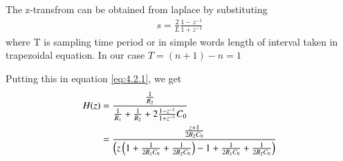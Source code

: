 \documentclass[journal,12pt,twocolumn]{IEEEtran}
\renewcommand\thesection{\arabic{section}}
\begin{document}
\begin{enumerate}[label=\arabic*.,ref=\thesection.\theenumi]
		\solution The z-transfrom can be obtained from laplace by substituting
		\begin{align}
			s=\frac{2}{L}\frac{1-z^{-1}}{1+z^{-1}}
		\end{align}
		where T is sampling time period or in simple words length of interval taken in trapezoidal equation. In our case $T=(n+1)-n=1$

		Putting this in equation \eqref{eq:4.2.1}, we get
		\begin{align}
			H(z)&=\frac{\frac{1}{R_2}}{\frac{1}{R_1}+\frac{1}{R_2}+2\frac{1-z^{-1}}{1+z^{-1}}C_0}\\
			&=\frac{\frac{z+1}{2R_2C_0}}{\left(z\left(1+\frac{1}{2R_1C_0}+\frac{1}{2R_2C_0}\right)-1+\frac{1}{2R_1C_0}+\frac{1}{2R_2C_0}\right)}
		\end{align}
	\end{enumerate}
\end{document}
